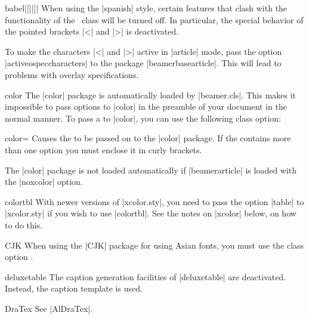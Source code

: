 \begin{package}{{babel}|[||]|}
  \beamernote
  When using the |spanish| style, certain features that clash with the functionality of the \beamer\ class will be turned off. In particular, the special behavior of the pointed brackets |<| and |>| is deactivated.

  \articlenote
  To make the characters |<| and |>| active in |article| mode, pass the option |activeospeccharacters| to the package |beamerbasearticle|. This will lead to problems with overlay specifications.
\end{package}

\begin{package}{{color}}
  \beamernote
  The |color| package is automatically loaded by |beamer.cls|. This makes it impossible to pass options to |color| in the preamble of your document in the normal manner. To pass a  to |color|, you can use the following class option:

  \begin{classoption}{color={\normalfont{}}}
  Causes the  to be passed on to the |color| package. If the  contains more than one option you must enclose it in curly brackets.
  \end{classoption}

  \articlenote
  The |color| package is not loaded automatically if |beamerarticle| is loaded with the |noxcolor| option.
\end{package}

\begin{package}{{colortbl}}
  \beamernote
  With newer versions of |xcolor.sty|, you need to pass the option |table| to |xcolor.sty| if you wish to use |colortbl|. See the notes on |xcolor| below, on how to do this.
\end{package}

\begin{package}{{CJK}}
  \beamernote
  When using the |CJK| package for using Asian fonts, you must use the class option .
\end{package}

\begin{package}{{deluxetable}}
  \beamernote
  The caption generation facilities of |deluxetable| are deactivated. Instead, the caption template is used.
\end{package}

\begin{package}{{DraTex}}
  See |AlDraTex|.
\end{package}

